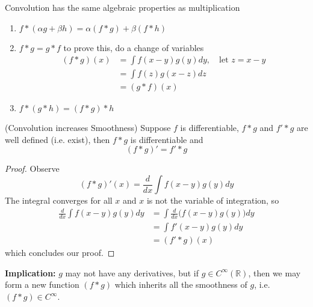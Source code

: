 
\begin{thm}
Convolution has the same algebraic properties as
multiplication
\begin{enumerate}
\item $f*(\alpha g+\beta h) = \alpha(f*g)+\beta(f*h)$
\item $f*g=g*f$ to prove this, do a change of variables
\begin{align*}
(f*g)(x) &= \int f(x-y)g(y)dy,\quad\text{let }z=x-y\\
&=\int f(z)g(x-z)dz\\
&=(g*f)(x)
\end{align*}
\item $f*(g*h)=(f*g)*h$
\end{enumerate}
\end{thm}
\begin{thm}{(Convolution increases Smoothness)}
Suppose $f$ is differentiable, $f*g$ and $f'*g$ are well
defined (i.e. exist), then $f*g$ is differentiable and
\begin{equation}
(f*g)' = f'*g
\end{equation}
\end{thm}
\begin{proof}
Observe
\begin{equation}
(f*g)'(x) = \frac{d}{dx}\int f(x-y)g(y)dy
\end{equation}
The integral converges for all $x$ and $x$ is not the
variable of integration, so
\begin{align*}
\frac{d}{dx}\int f(x-y)g(y)dy &= \int\frac{d}{dx}\Big(f(x-y)g(y)\Big)dy\\
&=\int f'(x-y)g(y)dy\\
&=(f'*g)(x)
\end{align*}
which concludes our proof.
\end{proof}

\textbf{Implication:} $g$ may not have any derivatives, but
if $g\in C^{\infty}(\mathbb{R})$, then we may form a new
function $(f*g)$ which inherits all the smoothness of $g$,
i.e. $(f*g)\in C^{\infty}$.

